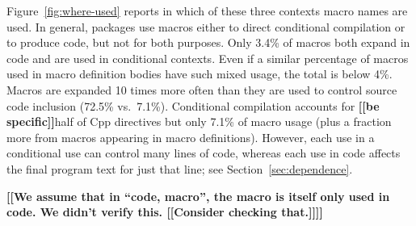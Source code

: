 \documentclass[10pt]{article}
\newcommand{\comment}[1]{\textbf{[[#1]]}}
\begin{document}
Figure~\ref{fig:where-used} reports in which of these three contexts macro
names are used.  In general, packages use macros either to direct
conditional compilation or to produce code, but not for both purposes.
Only 3.4\% of macros both expand in code and are used in conditional
contexts.  Even if a similar percentage of macros used in macro definition
bodies have such mixed usage, the total is below 4\%.  Macros are expanded
10 times more often than they are used to control source code inclusion
(72.5\% vs.\ 7.1\%).
Conditional compilation accounts for \comment{be specific}half of Cpp directives but only 7.1\%
of macro usage (plus a fraction more from macros appearing in macro
definitions).  However, each use in a conditional use can control many
lines of code, whereas each use in code affects the final program text for
just that line; see Section~\ref{sec:dependence}.

\comment{We assume that in ``code, macro'', the macro is itself only used
in code.  We didn't verify this.  \comment{Consider checking that.}}



\end{document}
